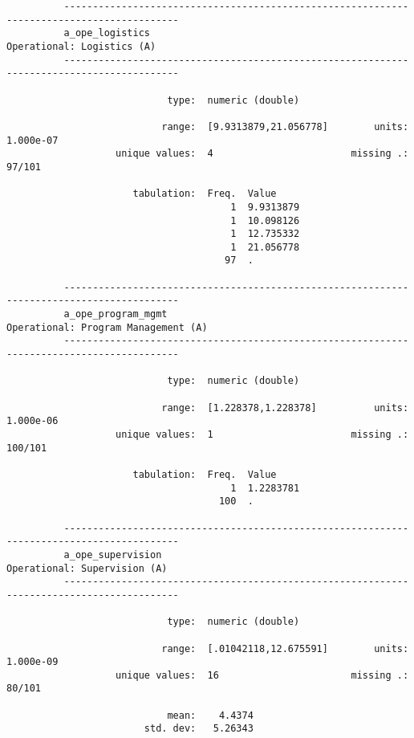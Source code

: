 \documentclass{article}
\begin{document}
\begin{verbatim}
          ------------------------------------------------------------------------------------------
          a_ope_logistics                                                 Operational: Logistics (A)
          ------------------------------------------------------------------------------------------
          
                            type:  numeric (double)
          
                           range:  [9.9313879,21.056778]        units:  1.000e-07
                   unique values:  4                        missing .:  97/101
          
                      tabulation:  Freq.  Value
                                       1  9.9313879
                                       1  10.098126
                                       1  12.735332
                                       1  21.056778
                                      97  .
          
          ------------------------------------------------------------------------------------------
          a_ope_program_mgmt                                     Operational: Program Management (A)
          ------------------------------------------------------------------------------------------
          
                            type:  numeric (double)
          
                           range:  [1.228378,1.228378]          units:  1.000e-06
                   unique values:  1                        missing .:  100/101
          
                      tabulation:  Freq.  Value
                                       1  1.2283781
                                     100  .
          
          ------------------------------------------------------------------------------------------
          a_ope_supervision                                             Operational: Supervision (A)
          ------------------------------------------------------------------------------------------
          
                            type:  numeric (double)
          
                           range:  [.01042118,12.675591]        units:  1.000e-09
                   unique values:  16                       missing .:  80/101
          
                            mean:    4.4374
                        std. dev:   5.26343
          

\end{verbatim}
\end{document}
